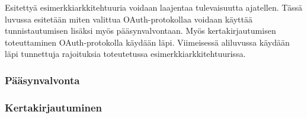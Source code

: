 Esitettyä esimerkkiarkkitehtuuria voidaan laajentaa tulevaisuutta ajatellen. Tässä luvussa esitetään miten valittua OAuth-protokollaa voidaan käyttää tunnistautumisen lisäksi myös pääsynvalvontaan. Myös kertakirjautumisen toteuttaminen OAuth-protokolla käydään läpi. Viimeisessä aliluvussa käydään läpi tunnettuja rajoituksia toteutetussa esimerkkiarkkitehtuurissa.

\subsubsection{Pääsynvalvonta}

\subsubsection{Kertakirjautuminen}

